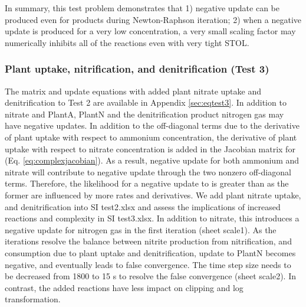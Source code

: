 \documentclass[gmd, manuscript]{copernicus}
\begin{document}
In summary, this test problem demonstrates that 1) negative update can be
produced even for products during Newton-Raphson iteration; 2) when a negative
update is produced for a very low concentration, a very small scaling factor
may numerically inhibits all of the reactions even with very tight STOL.

\subsubsection{Plant uptake, nitrification, and denitrification (Test 3)}
The matrix and update equations with added plant nitrate uptake and
denitrification to Test 2 are available in Appendix \ref{sec:eqtest3}. In addition
to nitrate and PlantA, PlantN and the denitrification product nitrogen gas may
have negative updates. In addition to the off-diagonal terms due to the
derivative of plant uptake with respect to ammonium concentration, the
derivative of plant uptake with respect to nitrate concentration is added in
the Jacobian matrix for  (Eq. \ref{eq:complexjacobian}). As a
result, negative update for both ammonium and nitrate will contribute to
negative  update through the two nonzero off-diagonal terms.
Therefore, the likelihood for a negative update to   is greater
than  as
the former are influenced by more rates and derivatives. We add plant nitrate
uptake, and denitrification into SI test2.xlsx and
assess the implications of increased reactions and complexity in SI
test3.xlsx. In addition to nitrate, this introduces a negative update for
nitrogen gas in the first iteration (sheet scale1).
As the iterations resolve the balance between nitrite production from
nitrification, and consumption due to plant uptake and denitrification, update
to PlantN becomes negative, and eventually leads to false convergence. The time
step size needs to be decreased from 1800 to 15 \unit{s} to resolve the false
convergence (sheet scale2). In contrast, the added reactions have less
impact on clipping and log transformation. 
\end{document}
